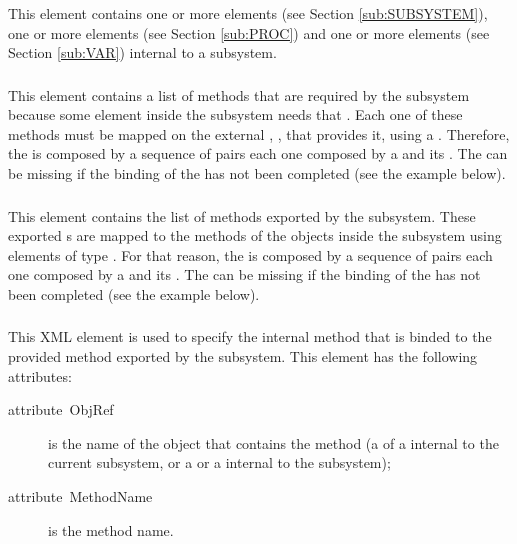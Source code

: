 This element contains one or more  elements (see
Section \ref{sub:SUBSYSTEM}), one or more  elements (see
Section \ref{sub:PROC}) and one or more  elements (see
Section \ref{sub:VAR}) internal to a subsystem.


\subsubsection{}

This element contains a list of methods that are required by the
subsystem because some  element inside the subsystem needs
that . Each one of these methods must be mapped on the
external , ,  that provides
it, using a . Therefore, the
 is composed by a sequence of pairs each
one composed by a  and its . The
 can be missing if the binding of the
 has not been completed (see the example below).


\subsubsection{}

This element contains the list of methods exported by the subsystem.
These exported s are mapped to the methods of the
objects inside the subsystem using elements of type
.  For that reason, the
 is composed by a sequence of pairs each
one composed by a  and its .
The  can be missing if the binding of the
 has not been completed (see the example below).


\subsubsection{}

This XML element is used to specify the internal method that is binded
to the provided method exported by the subsystem. This element has the
following attributes:

\begin{description}
\item [{attribute~ObjRef}] is the name of the object that contains the
  method (a  of a  internal
  to the current subsystem, or a  or a 
  internal to the subsystem);
\item [{attribute~MethodName}] is the method name.
\end{description}

